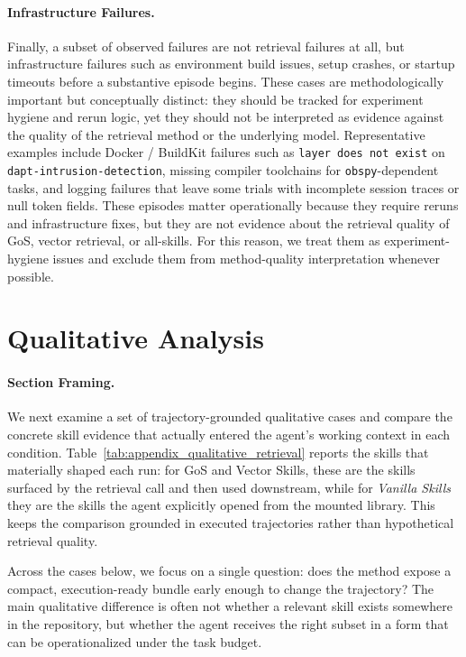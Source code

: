 \paragraph{Infrastructure Failures.}
Finally, a subset of observed failures are not retrieval failures at all, but infrastructure failures such as environment build issues, setup crashes, or startup timeouts before a substantive episode begins. These cases are methodologically important but conceptually distinct: they should be tracked for experiment hygiene and rerun logic, yet they should not be interpreted as evidence against the quality of the retrieval method or the underlying model. Representative examples include Docker / BuildKit failures such as \texttt{layer does not exist} on \texttt{dapt-intrusion-detection}, missing compiler toolchains for \texttt{obspy}-dependent tasks, and logging failures that leave some trials with incomplete session traces or null token fields. These episodes matter operationally because they require reruns and infrastructure fixes, but they are not evidence about the retrieval quality of GoS, vector retrieval, or all-skills. For this reason, we treat them as experiment-hygiene issues and exclude them from method-quality interpretation whenever possible.

\section{Qualitative Analysis}
\label{sec:appendix_qualitative}

\paragraph{Section Framing.}
We next examine a set of trajectory-grounded qualitative cases and compare the concrete skill evidence that actually entered the agent's working context in each condition. Table~\ref{tab:appendix_qualitative_retrieval} reports the skills that materially shaped each run: for GoS and Vector Skills, these are the skills surfaced by the retrieval call and then used downstream, while for \textit{Vanilla Skills} they are the skills the agent explicitly opened from the mounted library. This keeps the comparison grounded in executed trajectories rather than hypothetical retrieval quality.

Across the cases below, we focus on a single question: does the method expose a compact, execution-ready bundle early enough to change the trajectory? The main qualitative difference is often not whether a relevant skill exists somewhere in the repository, but whether the agent receives the right subset in a form that can be operationalized under the task budget.

